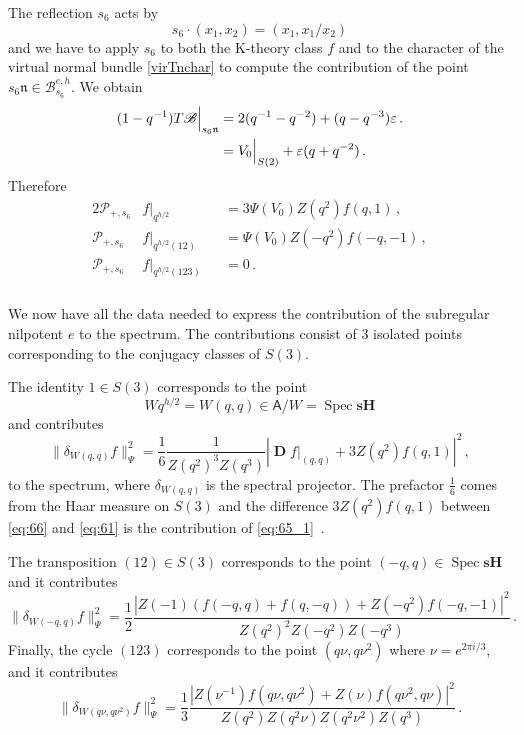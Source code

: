 \documentclass[14pt]{extarticle}
\newcommand{\bA}{\mathsf{A}}
\newcommand{\cP}{\mathscr{P}}
\newcommand{\cB}{\mathscr{B}}
\newcommand{\sH}{\mathbf{sH}}
\newcommand{\fn}{\mathfrak{n}}
\DeclareMathOperator{\spec}{Spec}
\DeclareMathOperator{\DD}{\mathbf{D}}
\theoremstyle{definition}
\begin{document}
The reflection $s_6$ acts by
\[
  s_6 \cdot (x_1,x_2) = (x_1,x_1/x_2) 
\]
and we have to apply $s_6$ to both the K-theory class $f$ and to 
the character of the virtual normal bundle \eqref{virTnchar} to compute
the contribution of the point $s_6 \fn \in \cB^{e,h}_{s_6}$.
We obtain
%
\begin{align}
(1-q^{-1}) T \cB \Big|_{s_6 \fn} &= 2 (q^{-1} - q^{-2}) + (q-q^{-3}) \varepsilon
                                   \,. \notag \\ 
 & = V_0 \Big|_{S(2)} + \varepsilon(q+q^{-2}) \,. \label{eq:72}
\end{align}
%
Therefore
%
\begin{alignat}{2}
\cP_{+,s_6} &f \Big|_{q^{h/2}} && = 3 \Psi(V_0) Z(q^2)  f(q,1) \,, \label{eq:65_1}
  \\
\cP_{+,s_6} &f \Big|_{q^{h/2}(12)} && =  \Psi(V_0) Z(-q^2) f(-q,-1) \,, \\
\cP_{+,s_6} &f \Big|_{q^{h/2}(123)} && = 0 \,. \label{eq:65}
\end{alignat}
%

\subsubsection{}
We now have all the data needed to express the contribution of the
subregular nilpotent $e$ to the spectrum. The contributions consist
of 3 isolated points corresponding to the conjugacy classes of
$S(3)$.

The identity $1\in S(3)$ corresponds to the point
\[
  W q^{h/2} = W(q,q) \in \bA/W
= \spec \sH
\]
and contributes
%
\begin{equation}
\| \delta_{W(q,q)} f \|_\Psi^2 = \frac{1}{6} \frac{1}{Z(q^2)^3 Z(q^3)}
\left| \DD f \Big|_{(q,q)} + 3 Z(q^2) f(q,1) \right|^2
\,, \label{eq:66}
\end{equation}
%
to the spectrum, where $\delta_{W(q,q)}$ is the spectral projector. 
The prefactor $\frac{1}{6}$ comes from the Haar measure on $S(3)$ and 
the difference $3 Z(q^2) f(q,1)$ between \eqref{eq:66} and
\eqref{eq:61} is the contribution of \eqref{eq:65_1} \,.

The transposition $(12) \in S(3)$ corresponds to the point $(-q,q) \in
\spec \sH$ and it contributes
%
\begin{equation}
\| \delta_{W(-q,q)} f \|_\Psi^2 = \frac{1}{2} \frac{
\left| Z(-1)(f(-q,q)+f(q,-q)) + Z(-q^2) f(-q,-1) \right|^2}
{Z(q^2)^2 Z(-q^2) Z(-q^3)} \,.
\label{eq:67_}
\end{equation}
%
Finally, the cycle $(123)$ corresponds to the point $(q \nu, q \nu^2)$
where $\nu=e^{2\pi i/3}$, and it contributes
\begin{equation}
\| \delta_{W(q\nu,q\nu^2)} f \|_\Psi^2 = \frac{1}{3} \frac{
\left| Z(\nu^{-1}) f(q\nu,q\nu^2)+Z(\nu) f(q\nu^2,q\nu) \right|^2}
{Z(q^2) Z(q^2 \nu) Z(q^2 \nu^2) Z(q^3)} \,. 
 \label{eq:68_}
\end{equation}
%
\end{document}
